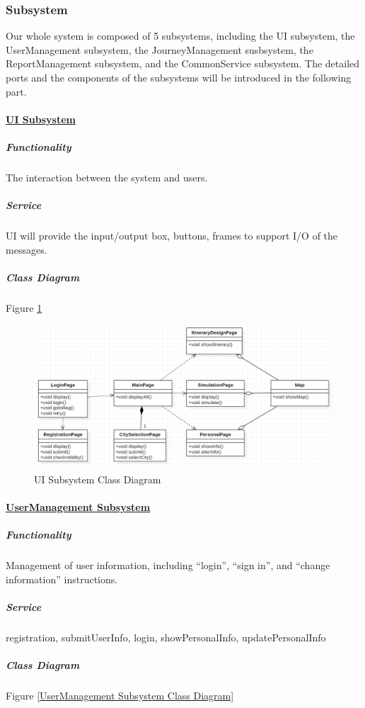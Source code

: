 \documentclass[10pt]{article}
\begin{document}
\subsubsection{Subsystem}
Our whole system is composed of 5 subsystems, including the UI subsystem, the UserManagement subsystem, the JourneyManagement susbsystem, the ReportManagement subsystem, and the CommonService subsystem. The detailed ports and the components of the subsystems will be introduced in the following part.

\paragraph{\underline{UI Subsystem}}
\subparagraph{Functionality} The interaction between the system and users.

\subparagraph{Service} UI will provide the input/output box, buttons, frames to support I/O of the messages.

\subparagraph{Class Diagram} Figure \ref{UI Subsystem Class Diagram}
\begin{figure}[H]
	\centering
	
	\includegraphics[width=14cm]{uiclass.png}
	\caption{UI Subsystem Class Diagram}
	\label{UI Subsystem Class Diagram}
\end{figure}

\paragraph{\underline{UserManagement Subsystem}}
\subparagraph{Functionality} Management of user information, including “login”, “sign in”, and “change information” instructions.

\subparagraph{Service}  registration, submitUserInfo, login, showPersonalInfo, updatePersonalInfo

\subparagraph{Class Diagram} Figure \ref{UserManagement Subsystem Class Diagram}
\end{document}
